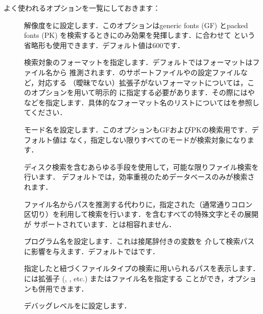 \documentclass[uplatex,dvipdfmx,tombow]{jsarticle}
\begin{document}
よく使われるオプションを一覧にしておきます：
%
\begin{description}
\item[]
解像度をに設定します．このオプションはgeneric fonts (GF) とpacked
fonts (PK) を検索するときにのみ効果を発揮します．に合わせて%
という省略形も使用できます．デフォルト値は600です．

\item[]
検索対象のフォーマットを指定します．デフォルトではフォーマットはファイル名から
推測されます．\MP のサポートファイルやの設定ファイルなど，対応する
（曖昧でない）拡張子がないフォーマットについては，このオプションを用いて明示的
に指定する必要があります．その際にはやなどを指定します．具体的なフォーマット名のリストについてはを参照してください．

\item[]
モード名を設定します．このオプションもGFおよびPKの検索用です．デフォルト値は
なく，指定しない限りすべてのモードが検索対象になります．

\item[]
ディスク検索を含むあらゆる手段を使用して，可能な限りファイル検索を行います．
デフォルトでは，効率重視のためデータベースのみが検索されます．

\item[]
ファイル名からパスを推測する代わりに，指定された（通常通りコロン
区切り）を利用して検索を行います．\samp{//}を含むすべての特殊文字とその展開が
サポートされています．とは相容れません．

\item[]
プログラム名を設定します．これは接尾辞付きの変数を
介して検索パスに影響を与えます．デフォルトではです．

\item[]
指定したと紐づくファイルタイプの検索に用いられるパスを表示します．
には拡張子 (, , etc.) またはファイル名を指定する
ことができ，オプションも併用できます．

\item[]
デバッグレベルをに設定します．
\end{description}
\end{document}
